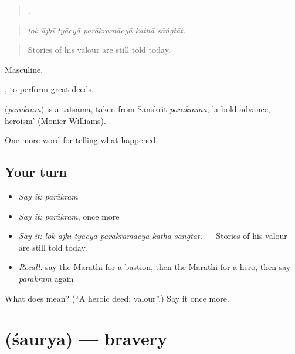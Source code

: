 \begin{quote}
     .
\end{quote}

\begin{quote}
\emph{lok ājhī tyācyā parākramācyā kathā sāṅgtāt.}
\end{quote}

\begin{quote}
Stories of his valour are still told today.
\end{quote}

Masculine.

 , to perform great deeds.

\begin{cousinweb}
\textbf{} (\emph{parākram}) is a tatsama, taken from Sanskrit \emph{parākrama}, 'a bold advance, heroism' (Monier-Williams).
\end{cousinweb}

\begin{grammarlens}[title={What you've built}]
One more word for telling what happened.
\end{grammarlens}

\subsection*{Your turn}
\begin{itemize}
\raggedright
  \item \emph{Say it:} \emph{parākram}
  \item \emph{Say it:} \emph{parākram}, once more
  \item \emph{Say it:} \emph{lok ājhī tyācyā parākramācyā kathā sāṅgtāt.} — Stories of his valour are still told today.
  \item \emph{Recall:} say the Marathi for a bastion, then the Marathi for a hero, then say \emph{parākram} again
\end{itemize}

\begin{tcolorbox}[breakable,colback=teal!4,colframe=teal!35!black,title={Before you move on}]
What does  mean? (\textquotedblleft{}A heroic deed; valour\textquotedblright{}.) Say it once more.
\end{tcolorbox}
\section[\texorpdfstring{\mr{शौर्य} (śaurya)}{शौर्य (śaurya)}]{ (śaurya) — bravery}

